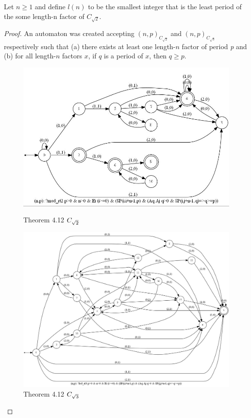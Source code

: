 \begin{theorem}\label{thm:lp-C2}
Let $n\geq1$ and define $l(n)$ to be the smallest integer that is the least period of the some length-n factor of $C_{\sqrt{2}}$. 
\end{theorem}
\begin{proof}
An automaton was created accepting $(n,p)_{C_{\sqrt{2}}}$ and $(n,p)_{C_{\sqrt{3}}}$ respectively such that (a) there exists at least one length-$n$ factor of period \textit{p} and (b) for all length-$n$ factors $x$, if $q$ is a period of $x$, then $q\geq p$.

\begin{figure}[h!]
\vspace{10mm}
	\begin{minipage}{0.45\textwidth}
      \centering
      \includegraphics[width=\linewidth]{sturmian_word_paper/paper_images/rt2Theorem20.jpg}
      \caption{Theorem 4.12 $C_{\sqrt{2}}$}
      \centering

  	\end{minipage}%
    \hspace{0.05\textwidth}
    \begin{minipage}{0.45\textwidth}
      \centering
      \includegraphics[width=\linewidth]{sturmian_word_paper/paper_images/rt3Theorem20.jpg}
      \caption{Theorem 4.12 $C_{\sqrt{3}}$}
      \centering


\end{minipage}
\end{figure}
\end{proof}
